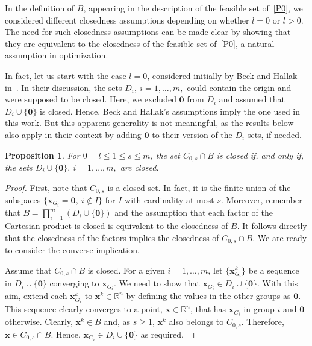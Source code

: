\documentclass[11pt,a4paper]{article}
\theoremstyle{plain}
\newtheorem{proposition}{Proposition}
\theoremstyle{definition}
\theoremstyle{remark}
\newcommand*{\vz}{\mathbf{0}}
\newcommand*\R{\mathbb{R}}
\newcommand*\x{\mathbf{x}}
\begin{document}
In the definition of $B$, appearing in the description of the feasible set of~\eqref{P0}, we considered different closedness assumptions depending on whether $l = 0$ or $l > 0$.
The need for such closedness assumptions can be made clear by showing that they are equivalent to the closedness of the feasible set of~\eqref{P0}, a natural assumption in optimization.

In fact, let us start with the case \( l = 0 \), considered initially by Beck and Hallak in~\cite{beck2018}.
In their discussion, the sets \( D_i,\ i = 1, \ldots, m, \) could contain the origin and were supposed to be closed.
Here, we excluded \( \vz \) from \( D_i \) and assumed that \(D_i \cup \{ \vz \} \) is closed.
Hence, Beck and Hallak's assumptions imply the one used in this work.
But this apparent generality is not meaningful, as the results below also apply in their context by adding \( \vz \) to their version of the \( D_i \) sets, if needed.

\begin{proposition}
  For \( 0 = l \leq 1 \leq s \leq m \), the set \( C_{0, s} \cap B \) is closed if, and only if, the sets \( D_i \cup \{ \vz \},\ i = 1, \ldots, m, \) are closed.
\end{proposition}

\begin{proof}
  First, note that \( C_{0, s} \) is a closed set.
  In fact, it is the finite union of the subspaces \( \{ \x_{G_i} = \vz,\ i \not\in I \} \) for \( I \) with cardinality at most \( s \).
  Moreover, remember that \( B = \prod_{i = 1}^m ( D_i \cup \{ \vz \} ) \) and the assumption that each factor of the Cartesian product is closed is equivalent to the closedness of \( B \).
  It follows directly that the closedness of the factors implies the closedness of \( C_{0, s} \cap B \).
  We are ready to consider the converse implication.

  Assume that \( C_{0, s} \cap B \) is closed.
  For a given \( i = 1, \ldots, m \), let \( \{ \x^k_{G_i} \} \) be a sequence in \( D_i \cup \{ \vz \} \) converging to \( \x_{G_i} \).
  We need to show that \( \x_{G_i} \in D_i \cup \{ \vz \} \).
  With this aim, extend each \( \x^k_{G_i} \) to \( \x^k \in \R^n \) by defining the values in the other groups as \( \vz \).
  This sequence clearly converges to a point, \( \x \in \R^n \), that has \( \x_{G_i} \) in group \( i \) and \( \vz \) otherwise.
  Clearly, \(\x^k \in B \) and, as $s \geq 1$, \( \x^k \) also belongs to \( C_{0, s} \).
  Therefore, \( \x \in C_{0, s} \cap B \).
  Hence, \( \x_{G_i} \in D_i \cup \{ \vz \} \) as required.
\end{proof}
\end{document}
